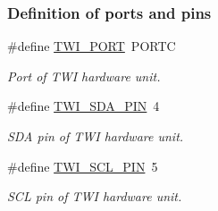 \subsubsection*{Definition of ports and pins}
\begin{DoxyCompactItemize}
\item 
\#define \hyperlink{a00008_ga762c164f4acd04d3ce3627fe73e7c018}{T\+W\+I\+\_\+\+P\+O\+RT}~P\+O\+R\+TC\hypertarget{a00008_ga762c164f4acd04d3ce3627fe73e7c018}{}\label{a00008_ga762c164f4acd04d3ce3627fe73e7c018}

\begin{DoxyCompactList}\small\item\em Port of T\+WI hardware unit. \end{DoxyCompactList}\item 
\#define \hyperlink{a00008_ga3f14ed8491293d0dda1372cceaa39851}{T\+W\+I\+\_\+\+S\+D\+A\+\_\+\+P\+IN}~4\hypertarget{a00008_ga3f14ed8491293d0dda1372cceaa39851}{}\label{a00008_ga3f14ed8491293d0dda1372cceaa39851}

\begin{DoxyCompactList}\small\item\em S\+DA pin of T\+WI hardware unit. \end{DoxyCompactList}\item 
\#define \hyperlink{a00008_gac0ad8b33f1be48e211f1eeae2dd65cee}{T\+W\+I\+\_\+\+S\+C\+L\+\_\+\+P\+IN}~5\hypertarget{a00008_gac0ad8b33f1be48e211f1eeae2dd65cee}{}\label{a00008_gac0ad8b33f1be48e211f1eeae2dd65cee}

\begin{DoxyCompactList}\small\item\em S\+CL pin of T\+WI hardware unit. \end{DoxyCompactList}\end{DoxyCompactItemize}
